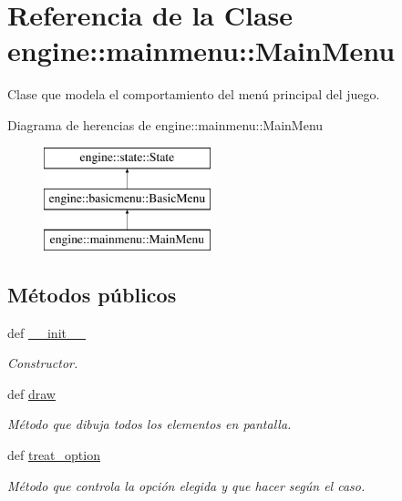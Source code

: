 \hypertarget{classengine_1_1mainmenu_1_1MainMenu}{
\section{\-Referencia de la \-Clase engine\-:\-:mainmenu\-:\-:\-Main\-Menu}
\label{classengine_1_1mainmenu_1_1MainMenu}
}


\-Clase que modela el comportamiento del menú principal del juego.  


\-Diagrama de herencias de engine\-:\-:mainmenu\-:\-:\-Main\-Menu\begin{figure}[H]
\begin{center}
\leavevmode
\includegraphics[height=3.000000cm]{classengine_1_1mainmenu_1_1MainMenu}
\end{center}
\end{figure}
\subsection*{\-Métodos públicos}
\begin{DoxyCompactItemize}
\item 
def \hyperlink{classengine_1_1mainmenu_1_1MainMenu_a442fb8c5d8b6ed44b484ad1ae261ff90}{\-\_\-\-\_\-init\-\_\-\-\_\-}
\begin{DoxyCompactList}\small\item\em \-Constructor. \end{DoxyCompactList}\item 
def \hyperlink{classengine_1_1mainmenu_1_1MainMenu_a160098220ba56608c008715babbe76b9}{draw}
\begin{DoxyCompactList}\small\item\em \-Método que dibuja todos los elementos en pantalla. \end{DoxyCompactList}\item 
\hypertarget{classengine_1_1mainmenu_1_1MainMenu_aa1ade9d71fc579870b9eb4ba59ba69b6}{
def \hyperlink{classengine_1_1mainmenu_1_1MainMenu_aa1ade9d71fc579870b9eb4ba59ba69b6}{treat\-\_\-option}}
\label{classengine_1_1mainmenu_1_1MainMenu_aa1ade9d71fc579870b9eb4ba59ba69b6}

\begin{DoxyCompactList}\small\item\em \-Método que controla la opción elegida y que hacer según el caso. \end{DoxyCompactList}\end{DoxyCompactItemize}


